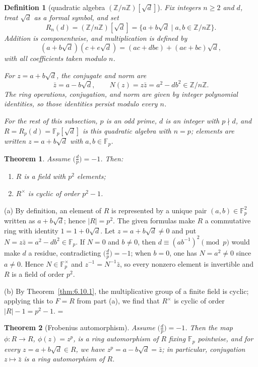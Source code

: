\documentclass[11pt]{article}
\makeatletter
\theoremstyle{ntstyle}
\newtheorem{theorem}{Theorem}[subsection]
\newtheorem{definition}{Definition}[subsection]
\let\nt@closedisplay\]
\def\nt@guardedclose{\@ifnextchar\par{\nt@closeafterpar}{\@ifnextchar\end{\postdisplaypenalty\@M\nt@closedisplay}{\nt@closedisplay}}}
\def\nt@closeafterpar\par{\@ifnextchar\par{\nt@closeafterpar}{\@ifnextchar\end{\postdisplaypenalty\@M\nt@closedisplay\par}{\nt@closedisplay\par}}}
\renewenvironment{proof}[1][\proofname]{\par
  \pushQED{\qed}\normalfont\topsep\medskipamount\edef\nt@afterproof{\@endparpenalty=\the\@endparpenalty\relax}\@beginparpenalty\@M\@endparpenalty\@M\let\]\nt@guardedclose\trivlist\item[]\textit{#1\@addpunct{.}} \ignorespaces}{\ifvmode\addpenalty\@M\fi\popQED\nt@afterproof\endtrivlist\@endpefalse}
\newcommand{\legs}[2]{\bigl(\tfrac{#1}{#2}\bigr)}
\makeatother
\begin{document}
\begin{definition}[{quadratic algebra $(\mathbb{Z}/n\mathbb{Z})[\sqrt{d}]$}]\label{def:7.9.1}
	Fix integers $n\ge2$ and $d$, treat $\sqrt d$ as a formal symbol, and
	set
	\[
		R_n(d)=(\mathbb{Z}/n\mathbb{Z})[\sqrt d]
		=\{a+b\sqrt d\mid a,b\in\mathbb{Z}/n\mathbb{Z}\}.
	\]
	Addition is componentwise, and multiplication is defined by
	\[
		(a+b\sqrt d)(c+e\sqrt d)
		=(ac+dbe)+(ae+bc)\sqrt d,
	\]
	with all coefficients taken modulo $n$.

	For $z=a+b\sqrt d$, the conjugate and norm are
	\[
		\bar z=a-b\sqrt d,
		\qquad
		N(z)=z\bar z=a^2-db^2\in\mathbb{Z}/n\mathbb{Z}.
	\]
	The ring operations, conjugation, and norm are given by integer
	polynomial identities, so those identities persist modulo every $n$.

	For the rest of this subsection, $p$ is an odd prime,
	$d$ is an integer with $p\nmid d$, and
	$R=R_p(d)=\mathbb{F}_p[\sqrt d]$ is this quadratic algebra with
	$n=p$; elements are written $z=a+b\sqrt d$ with
	$a,b\in\mathbb{F}_p$.
\end{definition}

\begin{theorem}\label{thm:7.9.1} Assume $\legs{d}{p}=-1$. Then:
	\begin{enumerate}[label={\alph*)}]
		\item $R$ is a field with $p^{2}$ elements;
		\item $R^{\times}$ is cyclic of order $p^{2}-1$.
	\end{enumerate}
\end{theorem}

\begin{proof} (a) By definition, an element of $R$ is represented by a
	unique pair $(a,b)\in\mathbb{F}_p^2$ written as $a+b\sqrt{d}$; hence
	$|R|=p^2$. The given formulas make $R$ a commutative ring with
	identity $1 = 1 + 0\sqrt{d}$. Let $z = a + b\sqrt{d} \neq 0$ and put
	$N = z\bar z = a^2 - d b^2 \in \mathbb{F}_p$. If $N = 0$ and $b
		\neq 0$, then $d \equiv (a b^{-1})^2 \pmod{p}$ would make $d$ a residue,
	contradicting $\legs{d}{p} = -1$; when $b = 0$, one has $N =
		a^2 \neq 0$ since $a \neq 0$. Hence $N \in \mathbb{F}_p^{\times}$ and
	$z^{-1} = N^{-1}\bar z$, so every nonzero element is invertible and
	$R$ is a field of order $p^2$.

	(b) By Theorem~\ref{thm:6.10.1}, the multiplicative group of a finite field
	is cyclic; applying this to $F=R$ from part (a), we find that $R^{\times}$ is cyclic of
	order $|R|-1=p^{2}-1$.
\end{proof}
\begin{theorem}[Frobenius automorphism]\label{thm:7.9.2} Assume
	$\legs{d}{p}=-1$. Then the map $\phi:R\to R$, $\phi(z)=z^{p}$, is a ring
	automorphism of $R$ fixing $\mathbb{F}_p$ pointwise, and for every
	$z = a + b\sqrt{d} \in R$, we have $z^p = a - b\sqrt{d} = \bar z$; in particular,
	conjugation $z\mapsto\bar z$ is a ring automorphism of $R$.
\end{theorem}
\end{document}
